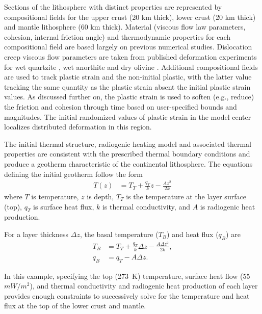 

Sections of the lithosphere with distinct properties are represented by compositional fields for the upper crust (20 km thick), lower crust (20 km thick) and mantle lithosphere (60 km thick). Material (viscous flow law parameters, cohesion, internal friction angle) and thermodynamic properties for each compositional field are based largely on previous numerical studies. Dislocation creep viscous flow parameters are taken from published deformation experiments for wet quartzite \cite{RB04}, wet anorthite \cite{RGWD06} and dry olivine \cite{HK04}. Additional compositional fields are used to track plastic strain and the non-initial plastic, with the latter value tracking the same quantity as the plastic strain absent the initial plastic strain values. As discussed further on, the plastic strain is used to soften (e.g., reduce) the friction and cohesion through time based on user-specified bounds and magnitudes. The initial randomized values of plastic strain in the model center localizes distributed deformation in this region.



The initial thermal structure, radiogenic heating model and associated thermal properties are consistent with the prescribed thermal boundary conditions and produce a geotherm characteristic of the continental lithosphere. The equations defining the initial geotherm \cite{Cha86} follow the form
\begin{align}
  \label{eq:continental-geotherm-1}
  T(z) &= T_T + \frac{q_T}{k}z - \frac{Az^2}{2k}
\end{align}
where $T$ is temperature, $z$ is depth, $T_T$ is the temperature at the layer surface (top), $q_T$ is surface heat flux, $k$ is thermal conductivity, and $A$ is radiogenic heat production.

For a layer thickness $\Delta z$, the basal temperature ($T_B$) and heat flux ($q_B$) are
\begin{align}
  \label{eq:continental-geotherm-2}
  T_B &= T_T + \frac{q_T}{k} \Delta z - \frac{A \Delta z^2}{2k},
  \\
  \label{eq:continental-geotherm-3}
  q_B &= q_T - A \Delta z.
\end{align}

In this example, specifying the top (\SI{273}{K}) temperature, surface heat flow (55 $mW/m^2$), and thermal conductivity and radiogenic heat production of each layer provides enough constraints to successively solve for the temperature and heat flux at the top of the lower crust and mantle.

